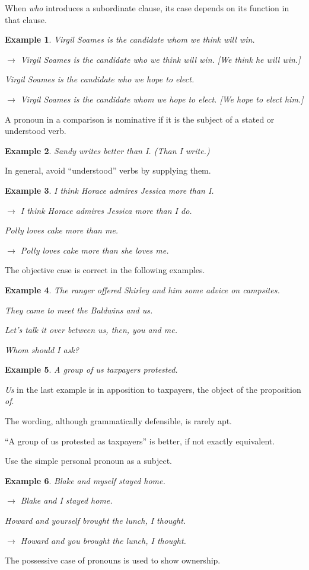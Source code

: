 \documentclass{article}
\newtheorem{example}{Example}
\begin{document}
When {\it who} introduces a subordinate clause, its case depends on its function in that clause.
\begin{example}
	Virgil Soames is the candidate whom we think will win.
	
	$\to$ Virgil Soames is the candidate who we think will win. [We think \emph{he} will win.]
	
	Virgil Soames is the candidate who we hope to elect.
	
	$\to$ Virgil Soames is the candidate whom we hope to elect. [We hope to elect \emph{him}.]
\end{example}
A pronoun in a comparison is nominative if it is the subject of a stated or understood verb.
\begin{example}
	Sandy writes better than I. (Than I write.)
\end{example}
In general, avoid ``understood'' verbs by supplying them.
\begin{example}
	I think Horace admires Jessica more than I.
	
	$\to$ I think Horace admires Jessica more than I do.
	
	Polly loves cake more than me.
	
	$\to$ Polly loves cake more than she loves me.
\end{example}
The objective case is correct in the following examples.
\begin{example}
	The ranger offered Shirley and him some advice on campsites.
	
	They came to meet the Baldwins and us.
	
	Let's talk it over between us, then, you and me.
	
	Whom should I ask?
\end{example}

\begin{example}
	A group of us taxpayers protested.
\end{example}
{\it Us} in the last example is in apposition to taxpayers, the object of the proposition {\it of}.

The wording, although grammatically defensible, is rarely apt.

``A group of us protested as taxpayers'' is better, if not exactly equivalent.

%
Use the simple personal pronoun as a subject.
\begin{example}
	Blake and myself stayed home.
	
	$\to$ Blake and I stayed home.
	
	Howard and yourself brought the lunch, I thought.
	
	$\to$ Howard and you brought the lunch, I thought.
\end{example}
The possessive case of pronouns is used to show ownership.
\end{document}
